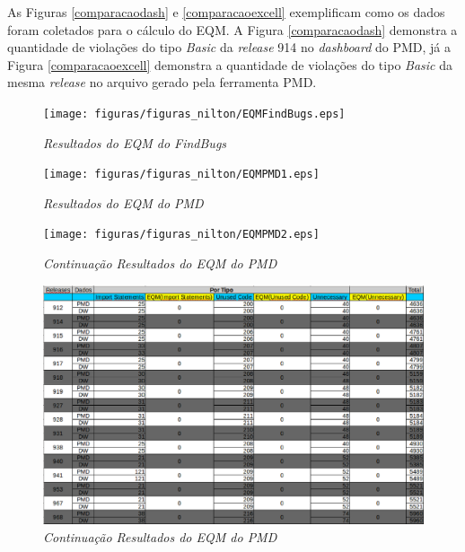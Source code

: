 As Figuras \ref{comparacaodash} e \ref{comparacaoexcell} exemplificam como os dados foram coletados para o cálculo do EQM. A Figura \ref{comparacaodash} demonstra a quantidade de violações do tipo \textit{Basic} da \textit{release} 914 no \textit{dashboard} do PMD, já a Figura \ref{comparacaoexcell} demonstra a quantidade de violações do tipo \textit{Basic} da mesma \textit{release} no arquivo gerado pela ferramenta PMD.

\begin{figure}[h!]
\centering
\texttt{[image: figuras/figuras\_nilton/EQMFindBugs.eps]}
\caption{\textit{Resultados do EQM do FindBugs}}
\label{EQMFindBugs}
\end{figure}

\begin{figure}[h!]
\centering
\texttt{[image: figuras/figuras\_nilton/EQMPMD1.eps]}
\caption{\textit{Resultados do EQM do PMD}}
\label{EQMPMD1}
\end{figure}

\begin{figure}[h!]
\centering
\texttt{[image: figuras/figuras\_nilton/EQMPMD2.eps]}
\caption{\textit{Continuação Resultados do EQM do PMD}}
\label{EQMPMD2}
\end{figure}

\begin{figure}[h!]
\centering
\includegraphics[keepaspectratio=false,scale=0.45,angle=90]{figuras/figuras_nilton/EQMPMD3.eps}
\caption{\textit{Continuação Resultados do EQM do PMD}}
\label{EQMPMD3}
\end{figure}

